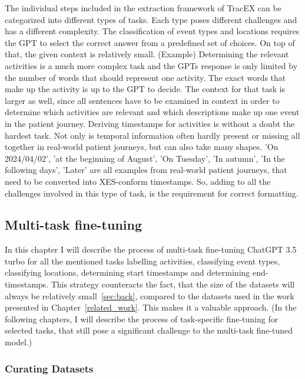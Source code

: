 The individual steps included in the extraction framework of TracEX can be categorized into different types of tasks. Each type poses different challenges and has a different complexity. The classification of event types and locations requires the GPT to select the correct answer from a predefined set of choices. On top of that, the given context is relatively small. (Example) Determining the relevant activities is a much more complex task and the GPTs response is only limited by the number of words that should represent one activity. The exact words that make up the activity is up to the GPT to decide. The context for that task is larger as well, since all sentences have to be examined in context in order to determine which activities are relevant and which descriptions make up one event in the patient journey. Deriving timestamps for activities is without a doubt the hardest task. Not only is temporal information often hardly present or missing all together in real-world patient journeys, but can also take many shapes. 'On 2024/04/02', 'at the beginning of August', 'On Tuesday', 'In autumn', 'In the following days', 'Later' are all examples from real-world patient journeys, that need to be converted into XES-conform timestamps. So, adding to all the challenges involved in this type of task, is the requirement for correct formatting.

\subsection{Multi-task fine-tuning}\label{sec:multi-task}
In this chapter I will describe the process of multi-task fine-tuning ChatGPT 3.5 turbo for all the mentioned tasks labelling activities, classifying event types, classifying locations, determining start timestamps and determining end-timestamps. This strategy counteracts the fact, that the size of the datasets will always be relatively small~\ref{sec:back}, compared to the datasets used in the work presented in Chapter~\ref{related_work}. This makes it a valuable approach.
(In the following chapters, I will describe the process of task-specific fine-tuning for selected tasks, that still pose a significant challenge to the multi-task fine-tuned model.)

\subsubsection{Curating Datasets}
